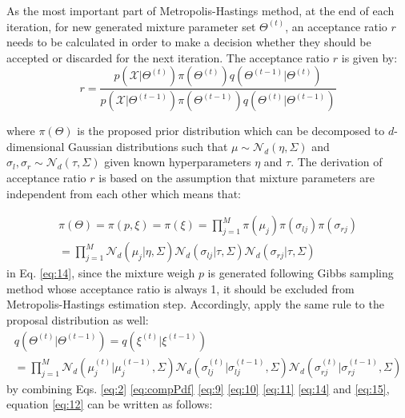 As the most important part of Metropolis-Hastings method, at the end of each iteration, for new generated mixture parameter set $\Theta^{(t)}$, an acceptance ratio $r$ needs to be calculated in order to make a decision whether they should be accepted or discarded for the next iteration. The acceptance ratio $r$ is given by:
\begin{equation}
r = \frac{p(\mathcal{X}|\Theta^{(t)})\pi(\Theta^{(t)})q(\Theta^{(t-1)}|\Theta^{(t)})}{p(\mathcal{X}|\Theta^{(t-1)})\pi(\Theta^{(t-1)})q(\Theta^{(t)}|\Theta^{(t-1)})}
\label{eq:12}
\end{equation}

where $\pi(\Theta)$ is the proposed prior distribution which can be decomposed to $d$-dimensional Gaussian distributions such that $\mu \sim \mathcal{N}_d(\eta,\Sigma)$ and $\sigma_l, \sigma_r \sim \mathcal{N}_d(\tau,\Sigma)$ given known hyperparameters $\eta$ and $\tau$. The derivation of acceptance ratio $r$ is based on the assumption that mixture parameters are independent from each other which means that:

\bigskip
\begin{multline}
\pi(\Theta) = \pi(p,\xi) = \pi(\xi) = \prod_{j=1}^M\pi(\mu_j)\pi(\sigma_{lj})\pi(\sigma_{rj})\\
= \prod_{j=1}^M\mathcal{N}_d(\mu_j|\eta,\Sigma)\mathcal{N}_d(\sigma_{lj}|\tau,\Sigma)\mathcal{N}_d(\sigma_{rj}|\tau,\Sigma)\quad
\label{eq:14}
\end{multline}
in Eq. \eqref{eq:14}, since the mixture weigh $p$ is generated following Gibbs sampling method whose acceptance ratio is always 1, it should be excluded from Metropolis-Hastings estimation step. Accordingly, apply the same rule to the proposal distribution as well:
\begin{multline}
q(\Theta^{(t)}|\Theta^{(t-1)}) = q(\xi^{(t)}|\xi^{(t-1)}) \\
= \prod_{j=1}^M\mathcal{N}_d(\mu_j^{(t)}|\mu_j^{(t-1)},\Sigma)\mathcal{N}_d(\sigma_{lj}^{(t)}|\sigma_{lj}^{(t-1)},\Sigma)\mathcal{N}_d(\sigma_{rj}^{(t)}|\sigma_{rj}^{(t-1)},\Sigma)
\label{eq:15}
\end{multline}
by combining Eqs. \eqref{eq:2} \eqref{eq:compPdf} \eqref{eq:9} \eqref{eq:10} \eqref{eq:11} \eqref{eq:14} and \eqref{eq:15}, equation \eqref{eq:12} can be written as follows:

